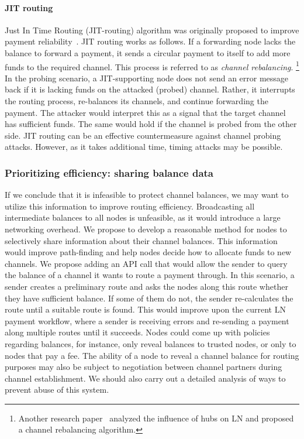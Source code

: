 \paragraph{JIT routing}
Just In Time Routing (JIT-routing) algorithm was originally proposed to improve payment reliability~\cite{Pickhardt2019, Pickhardt2019a}.
JIT routing works as follows.
If a forwarding node lacks the balance to forward a payment, it sends a circular payment to itself to add more funds to the required channel.
This process is referred to as \textit{channel rebalancing}.
\footnote{Another research paper~\cite{Conoscenti2019} analyzed the influence of hubs on LN and proposed a channel rebalancing algorithm.}
In the probing scenario, a JIT-supporting node does not send an error message back if it is lacking funds on the attacked (probed) channel.
Rather, it interrupts the routing process, re-balances its channels, and continue forwarding the payment.
The attacker would interpret this as a signal that the target channel has sufficient funds.
The same would hold if the channel is probed from the other side.
JIT routing can be an effective countermeasure against channel probing attacks.
However, as it takes additional time, timing attacks may be possible. 


\subsubsection*{Prioritizing efficiency: sharing balance data}

If we conclude that it is infeasible to protect channel balances, we may want to utilize this information to improve routing efficiency.
Broadcasting all intermediate balances to all nodes is unfeasible, as it would introduce a large networking overhead.
We propose to develop a reasonable method for nodes to selectively share information about their channel balances.
This information would improve path-finding and help nodes decide how to allocate funds to new channels.
We propose adding an API call that would allow the sender to query the balance of a channel it wants to route a payment through.
In this scenario, a sender creates a preliminary route and asks the nodes along this route whether they have sufficient balance.
If some of them do not, the sender re-calculates the route until a suitable route is found.
This would improve upon the current LN payment workflow, where a sender is receiving errors and re-sending a payment along multiple routes until it succeeds.
Nodes could come up with policies regarding balances, for instance, only reveal balances to trusted nodes, or only to nodes that pay a fee.
The ability of a node to reveal a channel balance for routing purposes may also be subject to negotiation between channel partners during channel establishment.
We should also carry out a detailed analysis of ways to prevent abuse of this system.


